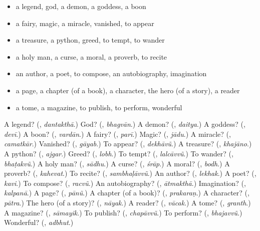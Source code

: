 \begin{itemize}
\raggedright
  \item a legend, god, a demon, a goddess, a boon
  \item a fairy, magic, a miracle, vanished, to appear
  \item a treasure, a python, greed, to tempt, to wander
  \item a holy man, a curse, a moral, a proverb, to recite
  \item an author, a poet, to compose, an autobiography, imagination
  \item a page, a chapter (of a book), a character, the hero (of a story), a reader
  \item a tome, a magazine, to publish, to perform, wonderful
\end{itemize}

\begin{tcolorbox}[breakable,colback=teal!4,colframe=teal!35!black,title={Before you move on}]
A legend? (\textbf{}, \emph{dantakthā}.) God? (\textbf{}, \emph{bhagvān}.) A demon? (\textbf{}, \emph{daitya}.) A goddess? (\textbf{}, \emph{devī}.) A boon? (\textbf{}, \emph{vardān}.) A fairy? (\textbf{}, \emph{parī}.) Magic? (\textbf{}, \emph{jādu}.) A miracle? (\textbf{}, \emph{camatkār}.) Vanished? (\textbf{}, \emph{gāyab}.) To appear? (\textbf{}, \emph{dekhāvũ}.) A treasure? (\textbf{}, \emph{khajāno}.) A python? (\textbf{}, \emph{ajgar}.) Greed? (\textbf{}, \emph{lobh}.) To tempt? (\textbf{}, \emph{lalcāvvũ}.) To wander? (\textbf{}, \emph{bhaṭakvũ}.) A holy man? (\textbf{}, \emph{sādhu}.) A curse? (\textbf{}, \emph{śrāp}.) A moral? (\textbf{}, \emph{bodh}.) A proverb? (\textbf{}, \emph{kahevat}.) To recite? (\textbf{}, \emph{sambhaḷāvvũ}.) An author? (\textbf{}, \emph{lekhak}.) A poet? (\textbf{}, \emph{kavi}.) To compose? (\textbf{}, \emph{racvũ}.) An autobiography? (\textbf{}, \emph{ātmakthā}.) Imagination? (\textbf{}, \emph{kalpanā}.) A page? (\textbf{}, \emph{pānũ}.) A chapter (of a book)? (\textbf{}, \emph{prakaraṇ}.) A character? (\textbf{}, \emph{pātra}.) The hero (of a story)? (\textbf{}, \emph{nāyak}.) A reader? (\textbf{}, \emph{vācak}.) A tome? (\textbf{}, \emph{granth}.) A magazine? (\textbf{}, \emph{sāmayik}.) To publish? (\textbf{}, \emph{chapāvvũ}.) To perform? (\textbf{}, \emph{bhajavvũ}.) Wonderful? (\textbf{}, \emph{adbhut}.)
\end{tcolorbox}
